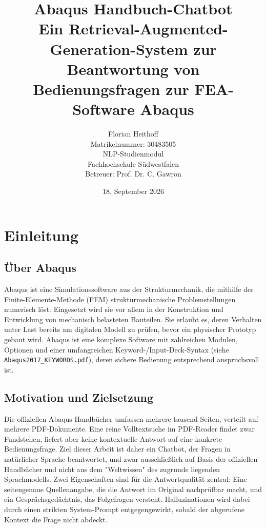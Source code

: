 \documentclass[11pt,a4paper]{article}
\title{Abaqus Handbuch-Chatbot \\ \large Ein Retrieval-Augmented-Generation-System zur Beantwortung von Bedienungsfragen zur FEA-Software Abaqus}
\author{
    Florian Heithoff \\[0.3em]
    \small Matrikelnummer: 30483505 \\
    \small NLP-Studienmodul \\
    \small Fachhochschule Südwestfalen \\
    \small Betreuer: Prof. Dr. C. Gawron
}
\date{18. September 2026}
\begin{document}

\maketitle
\tableofcontents
\newpage

\section{Einleitung}

\subsection{Über Abaqus}

Abaqus ist eine Simulationssoftware aus der Strukturmechanik, die mithilfe der
Finite-Elemente-Methode (FEM) strukturmechanische Problemstellungen numerisch
löst. Eingesetzt wird sie vor allem in der Konstruktion und Entwicklung von
mechanisch belasteten Bauteilen. Sie erlaubt es, deren Verhalten unter Last bereits am digitalen Modell zu prüfen, bevor ein physischer
Prototyp gebaut wird. Abaqus ist eine komplexe Software mit zahlreichen Modulen, Optionen und einer umfangreichen
Keyword-/Input-Deck-Syntax (siehe \texttt{Abaqus2017\_KEYWORDS.pdf}), deren
sichere Bedienung entsprechend anspruchsvoll ist.

\subsection{Motivation und Zielsetzung}

Die offiziellen Abaqus-Handbücher umfassen mehrere tausend Seiten, verteilt
auf mehrere PDF-Dokumente. Eine reine Volltextsuche im PDF-Reader findet
zwar Fundstellen, liefert aber keine kontextuelle Antwort auf eine konkrete
Bedienungsfrage. Ziel dieser Arbeit ist daher ein Chatbot, der Fragen in
natürlicher Sprache beantwortet, und zwar ausschließlich auf Basis der
offiziellen Handbücher und nicht aus dem "Weltwissen" des zugrunde liegenden
Sprachmodells. Zwei Eigenschaften sind für die Antwortqualität zentral: Eine
seitengenaue Quellenangabe, die die Antwort im Original nachprüfbar macht,
und ein Gesprächsgedächtnis, das Folgefragen versteht. Halluzinationen wird
dabei durch einen strikten System-Prompt entgegengewirkt, sobald der abgerufene Kontext die
Frage nicht abdeckt.
\end{document}
